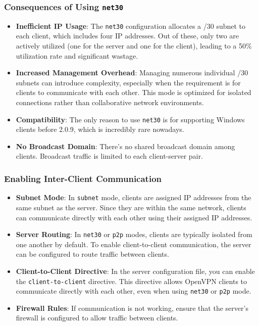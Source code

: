 \subsubsection{Consequences of Using \texttt{net30}}
\begin{itemize}
\item \textbf{Inefficient IP Usage}: The \texttt{net30} configuration allocates a /30 subnet to each client, which includes four IP addresses. Out of these, only two are actively utilized (one for the server and one for the client), leading to a 50\% utilization rate and significant wastage.
\item \textbf{Increased Management Overhead}: Managing numerous individual /30 subnets can introduce complexity, especially when the requirement is for clients to communicate with each other. This mode is optimized for isolated connections rather than collaborative network environments.
\item \textbf{Compatibility}: The only reason to use \texttt{net30} is for supporting Windows clients before 2.0.9, which is incredibly rare nowadays. 
\item \textbf{No Broadcast Domain}: There's no shared broadcast domain among clients. Broadcast traffic is limited to each client-server pair.
\end{itemize}

\subsubsection{Enabling Inter-Client Communication}
\begin{itemize}
    \item \textbf{Subnet Mode}: In \texttt{subnet} mode, clients are assigned IP addresses from the same subnet as the server. Since they are within the same network, clients can communicate directly with each other using their assigned IP addresses. 
    \item \textbf{Server Routing}: In \texttt{net30} or \texttt{p2p} modes, clients are typically isolated from one another by default. To enable client-to-client communication, the server can be configured to route traffic between clients.
    \item \textbf{Client-to-Client Directive}: In the server configuration file, you can enable the \texttt{client-to-client} directive. This directive allows OpenVPN clients to communicate directly with each other, even when using \texttt{net30} or \texttt{p2p} mode. 
    \item \textbf{Firewall Rules}: If communication is not working, ensure that the server's firewall is configured to allow traffic between clients.
\end{itemize}

